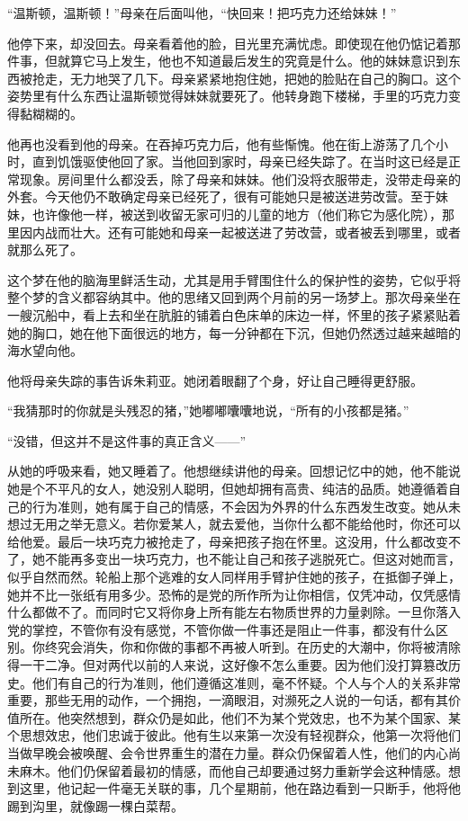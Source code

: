 ``温斯顿，温斯顿！''母亲在后面叫他，``快回来！把巧克力还给妹妹！''

他停下来，却没回去。母亲看着他的脸，目光里充满忧虑。即使现在他仍惦记着那件事，但就算它马上发生，他也不知道最后发生的究竟是什么。他的妹妹意识到东西被抢走，无力地哭了几下。母亲紧紧地抱住她，把她的脸贴在自己的胸口。这个姿势里有什么东西让温斯顿觉得妹妹就要死了。他转身跑下楼梯，手里的巧克力变得黏糊糊的。

他再也没看到他的母亲。在吞掉巧克力后，他有些惭愧。他在街上游荡了几个小时，直到饥饿驱使他回了家。当他回到家时，母亲已经失踪了。在当时这已经是正常现象。房间里什么都没丢，除了母亲和妹妹。他们没将衣服带走，没带走母亲的外套。今天他仍不敢确定母亲已经死了，很有可能她只是被送进劳改营。至于妹妹，也许像他一样，被送到收留无家可归的儿童的地方（他们称它为感化院），那里因内战而壮大。还有可能她和母亲一起被送进了劳改营，或者被丢到哪里，或者就那么死了。

这个梦在他的脑海里鲜活生动，尤其是用手臂围住什么的保护性的姿势，它似乎将整个梦的含义都容纳其中。他的思绪又回到两个月前的另一场梦上。那次母亲坐在一艘沉船中，看上去和坐在肮脏的铺着白色床单的床边一样，怀里的孩子紧紧贴着她的胸口，她在他下面很远的地方，每一分钟都在下沉，但她仍然透过越来越暗的海水望向他。

他将母亲失踪的事告诉朱莉亚。她闭着眼翻了个身，好让自己睡得更舒服。

``我猜那时的你就是头残忍的猪，''她嘟嘟囔囔地说，``所有的小孩都是猪。''

``没错，但这并不是这件事的真正含义------''

从她的呼吸来看，她又睡着了。他想继续讲他的母亲。回想记忆中的她，他不能说她是个不平凡的女人，她没别人聪明，但她却拥有高贵、纯洁的品质。她遵循着自己的行为准则，她有属于自己的情感，不会因为外界的什么东西发生改变。她从未想过无用之举无意义。若你爱某人，就去爱他，当你什么都不能给他时，你还可以给他爱。最后一块巧克力被抢走了，母亲把孩子抱在怀里。这没用，什么都改变不了，她不能再多变出一块巧克力，也不能让自己和孩子逃脱死亡。但这对她而言，似乎自然而然。轮船上那个逃难的女人同样用手臂护住她的孩子，在抵御子弹上，她并不比一张纸有用多少。恐怖的是党的所作所为让你相信，仅凭冲动，仅凭感情什么都做不了。而同时它又将你身上所有能左右物质世界的力量剥除。一旦你落入党的掌控，不管你有没有感觉，不管你做一件事还是阻止一件事，都没有什么区别。你终究会消失，你和你做的事都不再被人听到。在历史的大潮中，你将被清除得一干二净。但对两代以前的人来说，这好像不怎么重要。因为他们没打算篡改历史。他们有自己的行为准则，他们遵循这准则，毫不怀疑。个人与个人的关系非常重要，那些无用的动作，一个拥抱，一滴眼泪，对濒死之人说的一句话，都有其价值所在。他突然想到，群众仍是如此，他们不为某个党效忠，也不为某个国家、某个思想效忠，他们忠诚于彼此。他有生以来第一次没有轻视群众，他第一次将他们当做早晚会被唤醒、会令世界重生的潜在力量。群众仍保留着人性，他们的内心尚未麻木。他们仍保留着最初的情感，而他自己却要通过努力重新学会这种情感。想到这里，他记起一件毫无关联的事，几个星期前，他在路边看到一只断手，他将他踢到沟里，就像踢一棵白菜帮。

